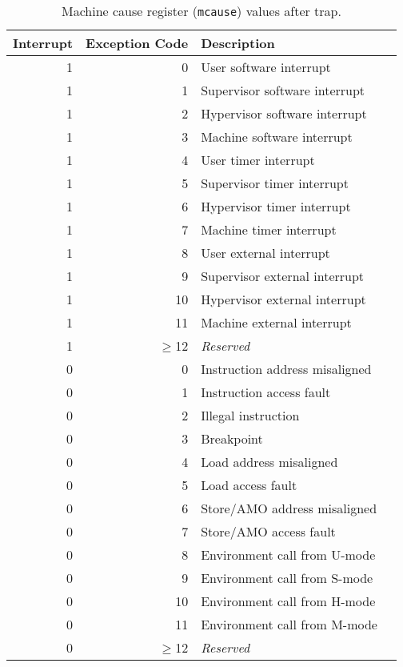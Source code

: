 \begin{table*}[h!]
\begin{center}
\begin{tabular}{|r|r|l|l|}

  \hline
  Interrupt & Exception Code  & Description \\
  \hline	 
  1         & 0               & User software interrupt \\
  1         & 1               & Supervisor software interrupt \\
  1         & 2               & Hypervisor software interrupt \\
  1         & 3               & Machine software interrupt \\
  1         & 4               & User timer interrupt \\
  1         & 5               & Supervisor timer interrupt \\
  1         & 6               & Hypervisor timer interrupt \\
  1         & 7               & Machine timer interrupt \\
  1         & 8               & User external interrupt \\
  1         & 9               & Supervisor external interrupt \\
  1         & 10              & Hypervisor external interrupt \\
  1         & 11              & Machine external interrupt \\
  1         & $\ge$12         & {\em Reserved} \\ \hline
  0         & 0               & Instruction address misaligned \\
  0         & 1               & Instruction access fault \\
  0         & 2               & Illegal instruction \\   
  0         & 3               & Breakpoint \\
  0         & 4               & Load address misaligned \\
  0         & 5               & Load access fault \\
  0         & 6               & Store/AMO address misaligned \\
  0         & 7               & Store/AMO access fault \\
  0         & 8               & Environment call from U-mode\\
  0         & 9               & Environment call from S-mode \\
  0         & 10              & Environment call from H-mode \\
  0         & 11              & Environment call from M-mode \\
  0         & $\ge$12         & {\em Reserved} \\
  \hline

\end{tabular}
\end{center}
\caption{Machine cause register ({\tt mcause}) values after trap.}
\label{mcauses}
\end{table*}

